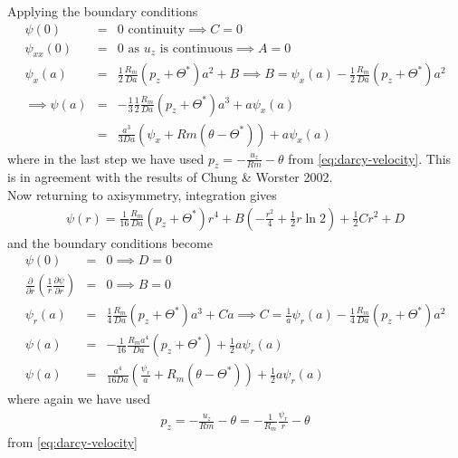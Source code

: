 \documentclass{article}
\begin{document}
Applying the boundary conditions
\begin{eqnarray}
\psi(0) &=& 0 \text{ continuity} \implies C = 0\\
\psi_{xx}(0) &=& 0 \text{ as } u_z \text{ is continuous} \implies A = 0 \\
\psi_x(a) &=&\frac{1}{2} \frac{R_m}{Da} \left( p_z + \Theta^* \right) a^2 + B \implies B = \psi_x(a) - \frac{1}{2} \frac{R_m}{Da} \left( p_z + \Theta^* \right) a^2 \\
\implies \psi(a) &=& -\frac{1}{3} \frac{1}{2} \frac{R_m}{Da} \left( p_z + \Theta^* \right) a^3 + a \psi_x(a) \\
&=& \frac{a^3}{3 Da} \left(\psi_x + Rm (\theta - \Theta^*) \right) + a \psi_x(a)
\end{eqnarray}
where in the last step we have used $p_z = - \frac{u_z}{Rm} -\theta$ from \eqref{eq:darcy-velocity}. This is in agreement with the results of Chung \& Worster 2002. \\

Now returning to axisymmetry, integration gives
\begin{eqnarray}
\psi(r) = \frac{1}{16}  \frac{R_m}{Da} \left( p_z + \Theta^* \right) r^4 + B \left( -\frac{r^2}{4} + \frac{1}{2} r \ln 2 \right) + \frac{1}{2} C r^2 + D
\end{eqnarray}
and the boundary conditions become
\begin{eqnarray}
\psi(0)&=& 0 \implies D = 0 \\
\frac{\partial}{\partial r} \left( \frac{1}{r} \frac{\partial \psi}{\partial r} \right) &=& 0 \implies B = 0\\
\psi_r(a) &=&  \frac{1}{4} \frac{R_m}{Da} \left( p_z + \Theta^* \right) a^3 + C a \implies C = \frac{1}{a} \psi_r(a) - \frac{1}{4} \frac{R_m}{Da} \left( p_z + \Theta^* \right) a^2 \\
\psi(a) &=& -\frac{1}{16} \frac{R_m a^4}{Da} \left( p_z + \Theta^* \right) +  \frac{1}{2} a \psi_r(a)\\
\psi(a) &=& \frac{a^4}{16 Da} \left(\frac{\psi_r}{a} + R_m (\theta - \Theta^*) \right)   + \frac{1}{2} a \psi_r(a) \label{eq:chimney-psi-bc}
\end{eqnarray}
where again we have used
\begin{eqnarray}
p_z = - \frac{u_z}{Rm} -\theta = - \frac{1}{R_m} \frac{\psi_r}{r} - \theta
\end{eqnarray} 
from \eqref{eq:darcy-velocity}
\end{document}
